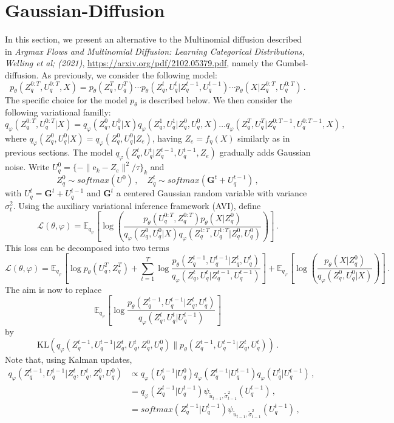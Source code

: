 \documentclass{article}
\newcommand{\rme}{\mathrm{e}}
\begin{document}
\section{Gaussian-Diffusion}
In this section, we present an alternative to the Multinomial diffusion described in {\em Argmax Flows and Multinomial Diffusion: Learning Categorical Distributions, Welling et al; (2021)}, \url{https://arxiv.org/pdf/2102.05379.pdf}, namely the Gumbel-diffusion.  As previously, we consider the following model:
$$
p_{\theta}(Z_q^{0:T},U_q^{0:T}, X) = p_{\theta}(Z_q^T,U_q^T) \cdots p_{\theta}(Z_q^t,U_q^t|Z_q^{t-1},U_q^{t-1}) \cdots p_{\theta}(X|Z^{0:T}_q,U_q^{0:T})\,.
$$
The specific choice for the model $p_\theta$ is described below. We then consider the following variational familly:
$$
q_{\varphi}(Z_q^{0:T},U_q^{0:T}| X) = q_{\varphi}(Z_q^0,U_q^0 | X) q_{\varphi}(Z_q^1,U_q^1 | Z_q^0, U_q^0,X) \ldots  q_{\varphi}(Z_q^T,U_q^T | Z_q^{0:T-1}, U_q^{0:T-1}, X)\,,
$$
where $q_{\varphi}(Z_q^0,U_q^0 | X) = q_{\varphi}(Z_q^0,U_q^0 | Z_e)$, having $Z_e = f_\eta(X)$ similarly as in  previous sections.
The model $q_{\varphi}(Z_q^t ,U_q^t| Z_q^{t-1},U_q^{t-1}, Z_e)$ gradually adds Gaussian noise. Write $U_q^0 = \{- \| \rme_k - Z_e\|^2/ \tau\}_k $ and 
$$
Z_q^0 \sim softmax(U^0 )\,, \quad Z_q^t \sim softmax(\mathbf{G}^t +U_q^{t-1})\,,
$$
with $U_q^t = \mathbf{G}^t +U_q^{t-1}$ and $\mathbf{G}^t$ a centered Gaussian random variable with variance $\sigma_t^2$. Using the auxiliary variational inference framework (AVI), define
$$
\mathcal{L}(\theta, \varphi) = \mathbb{E}_{q_\varphi} \left[ \log\left(\frac{p_\theta(U_q^{0:T},Z_q^{0:T})p_\theta(X|Z_q^0)}{q_\varphi(Z_q^0,U_q^0|X) q_\varphi(Z_q^{1:T},U_q^{1:T}|Z_q^0,U_q^0)}\right) \right]\,.
$$
This loss can be decomposed into two terms
$$
\mathcal{L}(\theta, \varphi) = \mathbb{E}_{q_\varphi} \left[\log p_\theta(U_q^T,Z_q^T) + \sum_{t=1}^T\log  \frac{p_\theta(Z_q^{t-1},U_q^{t-1}|Z_q^t,U_q^t)}{q_\varphi(Z_q^{t},U_q^t|Z_q^{t-1},U_q^{t-1})} \right] + \mathbb{E}_{q_\varphi} \left[ \log\left(\frac{p_\theta(X|Z_q^0)}{q_\varphi(Z_q^0,U_q^0|X)}\right) \right]\,.
$$
The aim is now to replace 
$$
 \mathbb{E}_{q_\varphi} \left[\log  \frac{p_\theta(Z_q^{t-1},U_q^{t-1}|Z_q^t,U_q^t)}{q_\varphi(Z_q^{t},U_q^t|U_q^{t-1})} \right]
$$
by
$$
\mathrm{KL}(q_\varphi(Z_q^{t-1},U_q^{t-1}|Z_q^t,U_q^{t},Z_q^0,U_q^{0})\|p_\theta(Z_q^{t-1},U_q^{t-1}|Z_q^t,U_q^t))\,.
$$
Note that, using Kalman updates, 
\begin{align*}
q_\varphi(Z_q^{t-1},U_q^{t-1}|Z_q^t,U_q^{t},Z_q^0,U_q^{0}) &\propto q_\varphi(U_q^{t-1}|U_q^{0}) q_\varphi(Z_q^{t-1}|U_q^{t-1})q_\varphi(U_q^{t}|U_q^{t-1})\,,\\
&= q_\varphi(Z_q^{t-1}|U_q^{t-1})\psi_{\tilde u_{t-1},\tilde \sigma_{t-1}^2}(U_q^{t-1})\,,\\
&= softmax(Z_q^{t-1}|U_q^{t-1})\psi_{\tilde u_{t-1},\tilde \sigma_{t-1}^2}(U_q^{t-1})\,,
\end{align*}
\end{document}

